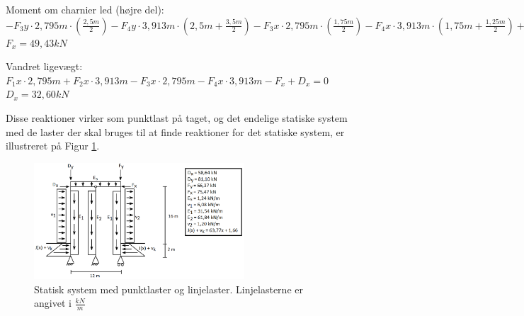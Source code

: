 \begin{center}
	Moment om charnier led (højre del): $- F_3y \cdot 2,\!795 m \cdot (\frac{2,\!5 m}{2}) - F_4y \cdot 3,\!913 m \cdot (2,\!5 m + \frac{3,\!5 m}{2}) - F_3x \cdot 2,\!795 m \cdot (\frac{1,\!75 m}{2}) - F_4x \cdot 3,\!913 m \cdot (1,\!75 m + \frac{1,\!25 m}{2}) + F_y \cdot 6 m - F_x \cdot 3 m = 0$ 
	\newline
	$F_x = 49,\!43 kN$
\end{center}

\begin{center}
	Vandret ligevægt: $F_1x \cdot 2,\!795 m + F_2x \cdot 3,\!913 m - F_3x \cdot 2,\!795 m - F_4x \cdot 3,\!913 m - F_x + D_x = 0$
	\newline
	$D_x = 32,\!60 kN$
\end{center}

Disse reaktioner virker som punktlast på taget, og det endelige statiske system med de laster der skal bruges til at finde reaktioner for det statiske system, er illustreret på Figur \ref{fig:alle}. 

\begin{figure}[htbp]
	\centering
	\includegraphics[width=0.7\textwidth]{billeder/endeligesystemmedlaster.png}
	\caption{Statisk system med punktlaster og linjelaster. Linjelasterne er angivet i $\frac{kN}{m}$}
	\label{fig:alle}
\end{figure}
